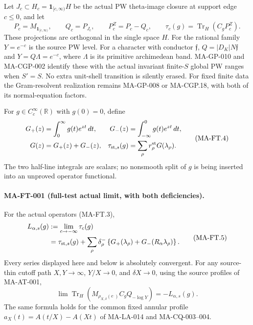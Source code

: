 Let $J_c\subset H_c=\mathbf1_{[c,\infty)}H$ be the actual PW
theta-image closure at support edge $c\le0$, and let
\[
 P_c=M_{\mathbf1_{[c,\infty)}},\qquad
 Q_c=P_{J_c},\qquad P_c^Z=P_c-Q_c,\qquad
 \tau_c(g)=\operatorname{Tr}_H(C_gP_c^Z).
 \tag{MA-FT.3}
\]
These projections are orthogonal in the single space $H$.
For the rational family $Y=e^{-c}$ is the source PW level.
For a character with conductor $\mathfrak f$,
$Q=|D_K|N\mathfrak f$ and $Y=Q\Lambda=e^{-c}$, where
$\Lambda$ is its primitive archimedean band.
MA-GP-010 and MA-CGP-002 identify these with the actual invariant
finite-$S$ global PW ranges when $S'=S$.  No extra unit-shell
transition is silently erased.  For fixed finite data the
Gram-resolvent realization remains MA-GP-008 or MA-CGP.18, with
both of its normal-equation factors.

For $g\in C_c^\infty(\mathbb R)$ with $g(0)=0$, define
\[
 \begin{aligned}
 G_+(z)&=\int_0^\infty g(t)e^{zt}\,dt,&
 G_-(z)&=\int_{-\infty}^0g(t)e^{zt}\,dt,\\
 G(z)&=G_+(z)+G_-(z),&
 \tau_{{\rm st},s}(g)&=\sum_\rho r_\rho^{\rm st}G(\lambda_\rho).
 \end{aligned}
 \tag{MA-FT.4}
\]
The two half-line integrals are scalars; no nonsmooth split of
$g$ is being inserted into an unproved operator functional.

\paragraph{MA-FT-001 (full-test actual limit, with both deficiencies).}
For the actual operators (MA-FT.3),
\[
 \begin{split}
 L_{\alpha,s}(g)
   &:=\lim_{c\to-\infty}\tau_c(g)\\
   &=\tau_{{\rm st},s}(g)
     +\sum_\rho\delta_\rho^-
       \left\{G_+(\lambda_\rho)
                      +G_-(R_\alpha\lambda_\rho)\right\}.
 \end{split}
 \tag{MA-FT.5}
\]
Every series displayed here and below is absolutely convergent.
For any source-thin cutoff path $X,Y\to\infty$, $Y/X\to0$,
and $\delta X\to0$, using the source profiles of MA-AT-001,
\[
 \lim\operatorname{Tr}_H
       (M_{\rho_{X,\delta}(e^\cdot)}C_gQ_{-\log Y})
                    =-L_{\alpha,s}(g).
 \tag{MA-FT.6}
\]
The same formula holds for the common fixed annular profile
$a_X(t)=A(t/X)-A(Xt)$ of MA-LA-014 and MA-CQ-003--004.

